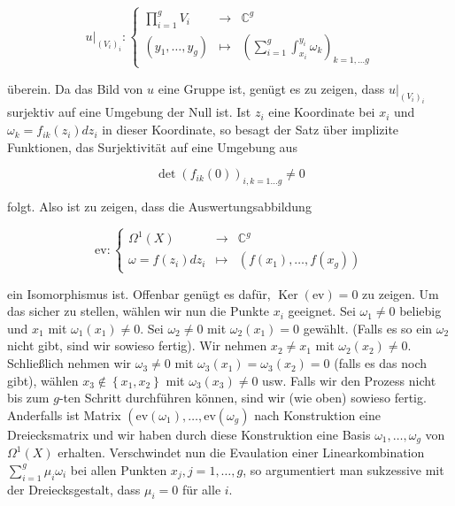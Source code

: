 \documentclass[10pt, letterpaper]{article}
\begin{document}
$$
\left.u\right|_{\left(V_{i}\right)_{i}}:\left\{\begin{array}{lll}
\prod_{i=1}^{g} V_{i} & \longrightarrow & \mathbb{C}^{g} \\
\left(y_{1}, \ldots, y_{g}\right) & \longmapsto & \left(\sum_{i=1}^{g} \int_{x_{i}}^{y_{i}} \omega_{k}\right)_{k=1, \ldots g}
\end{array}\right.
$$

überein. Da das Bild von $u$ eine Gruppe ist, genügt es zu zeigen, dass $\left.u\right|_{\left(V_{i}\right)_{i}}$ surjektiv auf eine Umgebung der Null ist. Ist $z_{i}$ eine Koordinate bei $x_{i}$ und\\
$\omega_{k}=f_{i k}\left(z_{i}\right) d z_{i}$ in dieser Koordinate, so besagt der Satz über implizite Funktionen, das Surjektivität auf eine Umgebung aus

$$
\operatorname{det}\left(f_{i k}(0)\right)_{i, k=1 \ldots g} \neq 0
$$

folgt. Also ist zu zeigen, dass die Auswertungsabbildung

$$
\mathrm{ev}:\left\{\begin{array}{lll}
\Omega^{1}(X) & \longrightarrow & \mathbb{C}^{g} \\
\omega=f\left(z_{i}\right) d z_{i} & \longmapsto & \left(f\left(x_{1}\right), \ldots, f\left(x_{g}\right)\right)
\end{array}\right.
$$

ein Isomorphismus ist. Offenbar genügt es dafür, $\operatorname{Ker}(\mathrm{ev})=0$ zu zeigen. Um das sicher zu stellen, wählen wir nun die Punkte $x_{i}$ geeignet. Sei $\omega_{1} \neq 0$ beliebig und $x_{1}$ mit $\omega_{1}\left(x_{1}\right) \neq 0$. Sei $\omega_{2} \neq 0$ mit $\omega_{2}\left(x_{1}\right)=0$ gewählt. (Falls es so ein $\omega_{2}$ nicht gibt, sind wir sowieso fertig). Wir nehmen $x_{2} \neq x_{1}$ mit $\omega_{2}\left(x_{2}\right) \neq 0$. Schließlich nehmen wir $\omega_{3} \neq 0$ mit $\omega_{3}\left(x_{1}\right)=\omega_{3}\left(x_{2}\right)=0$ (falls es das noch gibt), wählen $x_{3} \notin\left\{x_{1}, x_{2}\right\}$ mit $\omega_{3}\left(x_{3}\right) \neq 0$ usw. Falls wir den Prozess nicht bis zum $g$-ten Schritt durchführen können, sind wir (wie oben) sowieso fertig. Anderfalls ist Matrix $\left(\mathrm{ev}\left(\omega_{1}\right), \ldots, \mathrm{ev}\left(\omega_{g}\right)\right.$ nach Konstruktion eine Dreiecksmatrix und wir haben durch diese Konstruktion eine Basis $\omega_{1}, \ldots, \omega_{g}$ von $\Omega^{1}(X)$ erhalten. Verschwindet nun die Evaulation einer Linearkombination $\sum_{i=1}^{g} \mu_{i} \omega_{i}$ bei allen Punkten $x_{j}, j=1, \ldots, g$, so argumentiert man sukzessive mit der Dreiecksgestalt, dass $\mu_{i}=0$ für alle $i$.
\end{document}
